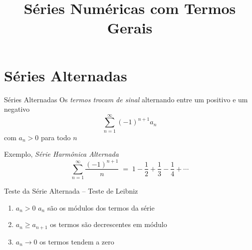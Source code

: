 
\usepackage{integracao_e_series}

\title {Séries Numéricas com Termos Gerais}



\addtitle

\section{Séries Alternadas}

\begin{frame}{Séries Alternadas}
  Os \emph{termos trocam de sinal}
  \pause
  alternando entre um positivo e um negativo
  \[ \sum_{n=1}^\infty (-1)^{n+1} a_n \]
  com $a_n >0$ para todo $n$

  \pause
  \vspace{\baselineskip}
  Exemplo, \emph{Série Harmônica Alternada}
  \[
    \sum_{n=1}^\infty \frac{(-1)^{n+1}}{n}
    \;=\; 1 - \frac{1}{2} + \frac{1}{3} - \frac{1}{4} + \cdots
  \]
\end{frame}

\begin{frame}{Teste da Série Alternada -- Teste de Leibniz}

  \vspace{0.5\baselineskip}
  \begin{enumerate}[<+->]
      \item $a_n>0$           \tabto{30mm} $a_n$ são os módulos dos termos da série  \\[2mm]
      \item $a_n\geq a_{n+1}$ \tabto{30mm} os termos são decrescentes em módulo      \\[2mm]
      \item $a_n\to 0$        \tabto{30mm} os termos tendem a zero
  \end{enumerate}

\end{frame}

